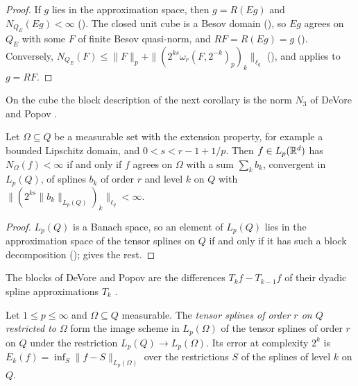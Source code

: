 \begin{proof}
\leanok
{}
If $g$ lies in the approximation space, then $g = R(E g)$ and $N_{Q_E}(E g) < \infty$
(). The closed unit cube is a Besov domain
(), so $E g$ agrees on $Q_E$ with some $F$ of finite Besov
quasi-norm, and $R F = R(E g) = g$ (). Conversely,
$N_{Q_E}(F) \leq \|F\|_p + \|(2^{ks} \omega_r(F, 2^{-k})_p)_k\|_{\ell_q}$
(), and  applies to $g = R F$.
\end{proof}

On the cube the block description of the next corollary is the norm $N_3$ of DeVore and Popov
\cite[Theorem~5.1]{DeVorePopovTAMS}.

\begin{corollary}
\label{cor:domain-spline-blocks}
\leanok
{}
Let $\Omega \subseteq Q$ be a measurable set with the extension property, for example a bounded
Lipschitz domain, and $0 < s < r - 1 + 1/p$. Then $f \in L_p(\mathbb{R}^d)$ has $N_\Omega(f) < \infty$ if
and only if $f$ agrees on $\Omega$ with a sum $\sum_k b_k$, convergent in $L_p(Q)$, of splines
$b_k$ of order $r$ and level $k$ on $Q$ with $\|(2^{ks} \|b_k\|_{L_p(Q)})_k\|_{\ell_q} < \infty$.
\end{corollary}

\begin{proof}
\leanok
{}
$L_p(Q)$ is a Banach space, so an element of $L_p(Q)$ lies in the approximation space of the
tensor splines on $Q$ if and only if it has such a block decomposition
();  gives the rest.
\end{proof}

The blocks of DeVore and Popov are the differences $T_k f - T_{k-1} f$ of their dyadic spline
approximations $T_k$ \cite[(4.20)]{DeVorePopovTAMS}.

\begin{definition}
\label{def:domain-spline-scheme}
\leanok
{}
Let $1 \leq p \leq \infty$ and $\Omega \subseteq Q$ measurable. The \emph{tensor splines of order
$r$ on $Q$ restricted to $\Omega$} form the image scheme in $L_p(\Omega)$ of the tensor splines of
order $r$ on $Q$ under the restriction $L_p(Q) \to L_p(\Omega)$. Its error at complexity $2^k$ is
$E_k(f) = \inf_S \|f - S\|_{L_p(\Omega)}$ over the restrictions $S$ of the splines of level $k$
on $Q$.
\end{definition}

